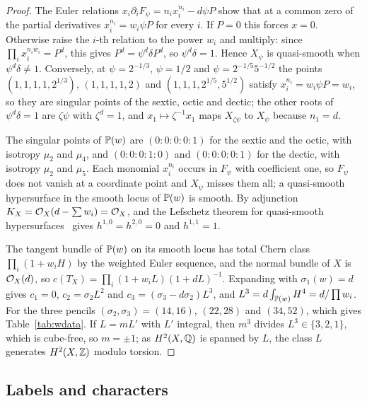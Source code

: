 \begin{proof}
The Euler relations $x_i\partial_iF_\psi=n_ix_i^{n_i}-d\psi P$ show that at a
common zero of the partial derivatives $x_i^{n_i}=w_i\psi P$ for every $i$.
If $P=0$ this forces $x=0$. Otherwise raise the $i$-th relation to the power
$w_i$ and multiply: since $\prod_ix_i^{n_iw_i}=P^d$, this gives
$P^d=\psi^d\delta P^d$, so $\psi^d\delta=1$. Hence $X_\psi$ is quasi-smooth
when $\psi^d\delta\ne1$. Conversely, at $\psi=2^{-1/3}$, $\psi=1/2$ and
$\psi=2^{-1/5}5^{-1/2}$ the points $(1,1,1,1,2^{1/3})$, $(1,1,1,1,2)$ and
$(1,1,1,2^{1/5},5^{1/2})$ satisfy $x_i^{n_i}=w_i\psi P=w_i$, so they are
singular points of the sextic, octic and dectic; the other roots of
$\psi^d\delta=1$ are $\zeta\psi$ with $\zeta^d=1$, and
$x_1\mapsto\zeta^{-1}x_1$ maps $X_{\zeta\psi}$ to $X_\psi$ because $n_1=d$.

The singular points of $\mathbb{P}(w)$ are $(0{:}0{:}0{:}0{:}1)$ for the sextic
and the octic, with isotropy $\mu_2$ and $\mu_4$, and $(0{:}0{:}0{:}1{:}0)$
and $(0{:}0{:}0{:}0{:}1)$ for the dectic, with isotropy $\mu_2$ and $\mu_5$.
Each monomial $x_i^{n_i}$ occurs in $F_\psi$ with coefficient one, so $F_\psi$
does not vanish at a coordinate point and $X_\psi$ misses them all; a
quasi-smooth hypersurface in the smooth locus of $\mathbb{P}(w)$ is smooth. By
adjunction $K_X=\mathcal{O}_X(d-\sum w_i)=\mathcal{O}_X$, and the Lefschetz theorem for
quasi-smooth hypersurfaces~\cite{Dol82} gives $h^{1,0}=h^{2,0}=0$ and
$h^{1,1}=1$.

The tangent bundle of $\mathbb{P}(w)$ on its smooth locus has total Chern class
$\prod_i(1+w_iH)$ by the weighted Euler sequence, and the normal bundle of
$X$ is $\mathcal{O}_X(d)$, so $c(T_X)=\prod_i(1+w_iL)(1+dL)^{-1}$. Expanding with
$\sigma_1(w)=d$ gives $c_1=0$, $c_2=\sigma_2L^2$ and
$c_3=(\sigma_3-d\sigma_2)L^3$, and $L^3=d\int_{\mathbb{P}(w)}H^4=d/\prod w_i$. For
the three pencils $(\sigma_2,\sigma_3)=(14,16)$, $(22,28)$ and $(34,52)$,
which gives Table~\ref{tab:wdata}. If $L=mL'$ with $L'$ integral, then
$m^3$ divides $L^3\in\{3,2,1\}$, which is cube-free, so $m=\pm1$; as
$H^2(X,\mathbb{Q})$ is spanned by $L$, the class $L$ generates $H^2(X,\mathbb{Z})$ modulo
torsion.
\end{proof}

\subsection{Labels and characters}

